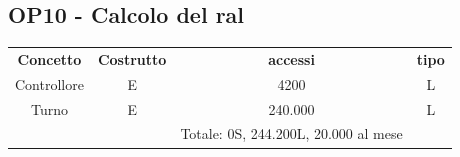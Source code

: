    \subsection*{OP10 - Calcolo del ral}
    \begin{table}[H]
    \centering
    \begin{tabular}{cccc}
  
    \rowcolor{tableheadercolor}
    \textbf{Concetto} & \textbf{Costrutto} & \textbf{accessi} & \textbf{tipo}\\
  
    Controllore & E & 4200 & L \\
    Turno & E & 240.000 & L \\
    & & Totale: 0S, 244.200L, 20.000 al mese &\\
  
    \end{tabular}
    \end{table}
  
